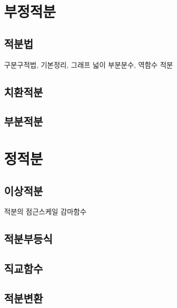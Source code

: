 \documentclass{../../large}
\begin{document}
\chapter{부정적분}

\section{적분법}
구분구적법, 기본정리, 그래프 넓이
부분분수, 역함수 적분
\section{치환적분}
\section{부분적분}
\section{}







\chapter{정적분}

\section{이상적분}
적분의 점근스케일
감마함수
\section{적분부등식}
\section{직교함수}
\section{적분변환}
\end{document}

